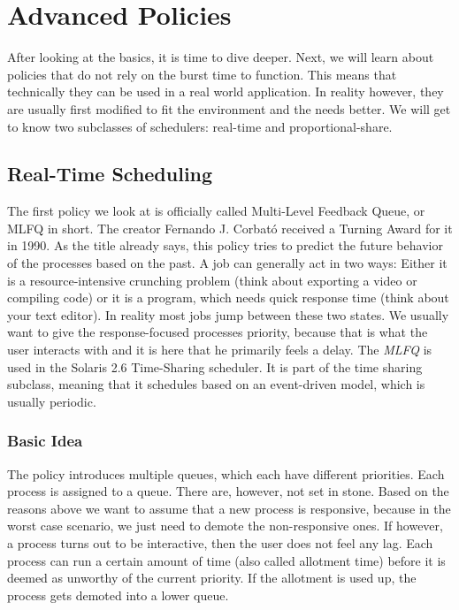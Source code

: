 \chapter{Advanced Policies}
After looking at the basics, it is time to dive deeper. Next, we will learn about policies that do not rely on the burst time to function. This means that technically they can be used in a real world application. In reality however, they are usually first modified to fit the environment and the needs better.
We will get to know two subclasses of schedulers: real-time and proportional-share.

\section{Real-Time Scheduling}


The first policy we look at is officially called Multi-Level Feedback Queue, or MLFQ in short. The creator Fernando J. Corbató received a Turning Award for it in 1990. 
As the title already says, this policy tries to predict the future behavior of the processes based on the past.
A job can generally act in two ways:
Either it is a resource-intensive crunching problem (think about exporting a video or compiling code) or it is a program, which needs quick response time (think about your text editor).
In reality most jobs jump between these two states.
We usually want to give the response-focused processes priority, because that is what the user interacts with and it is here that he primarily feels a delay.
The \emph{MLFQ} is used in the Solaris 2.6 Time-Sharing scheduler.
It is part of the time sharing subclass, meaning that it schedules based on an event-driven model, which is usually periodic.

\subsection{Basic Idea}

The policy introduces multiple queues, which each have different priorities.
Each process is assigned to a queue. There are, however, not set in stone.
Based on the reasons above we want to assume that a new process is responsive, because in the worst case scenario, we just need to demote the non-responsive ones.
If however, a process turns out to be interactive, then the user does not feel any lag. 
Each process can run a certain amount of time (also called allotment time) before it is deemed as unworthy of the current priority.
If the allotment is used up, the process gets demoted into a lower queue.

